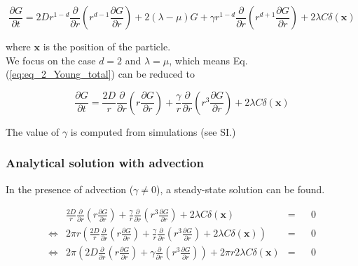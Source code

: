 \begin{equation}
\frac{\partial G}{\partial t}=2Dr^{1-d}\frac{\partial}{\partial r}\left(r^{d-1}\frac{\partial G}{\partial r}\right)+2(\lambda-\mu)G+\gamma r^{1-d}\frac{\partial}{\partial r}\left(r^{d+1}\frac{\partial G}{\partial r}\right)+2\lambda C\delta(\boldsymbol{x})\label{eq:eq_2_Young_total}
\end{equation}

where $\boldsymbol{x}$ is the position of the particle.\\

We focus on the case $d=2$ and $\lambda=\mu$, which means Eq.
(\ref{eq:eq_2_Young_total}) can be reduced to

\begin{equation}
\frac{\partial G}{\partial t}=\frac{2D}{r}\frac{\partial}{\partial r}\left(r\frac{\partial G}{\partial r}\right)+\frac{\gamma}{r}\frac{\partial}{\partial r}\left(r^{3}\frac{\partial G}{\partial r}\right)+2\lambda C\delta(\boldsymbol{x})\label{eq:eq_2_Young_reduced}
\end{equation}

The value of $\gamma$ is computed from simulations (see SI.)

\subsubsection*{Analytical solution with advection}

In the presence of advection ($\gamma\neq0$), a steady-state solution
can be found. 

\begin{align}
  &  \frac{2D}{r}\frac{\partial}{\partial r}\left(r\frac{\partial G}{\partial r}\right)+\frac{\gamma}{r}\frac{\partial}{\partial r}\left(r^{3}\frac{\partial G}{\partial r}\right)+2\lambda C\delta(\boldsymbol{x})\nonumber & = & & 0 \\
\Leftrightarrow & 2\pi r\left(\frac{2D}{r}\frac{\partial}{\partial r}\left(r\frac{\partial G}{\partial r}\right)+\frac{\gamma}{r}\frac{\partial}{\partial r}\left(r^{3}\frac{\partial G}{\partial r}\right)+2\lambda C\delta(\boldsymbol{x})\right)\nonumber & = & & 0 \\
 \Leftrightarrow  & 2\pi\left(2D\frac{\partial}{\partial r}\left(r\frac{\partial G}{\partial r}\right)+\gamma\frac{\partial}{\partial r}\left(r^{3}\frac{\partial G}{\partial r}\right)\right)+2\pi r2\lambda C\delta(\boldsymbol{x}) & = & & 0\label{eq:steady_state}
\end{align}

